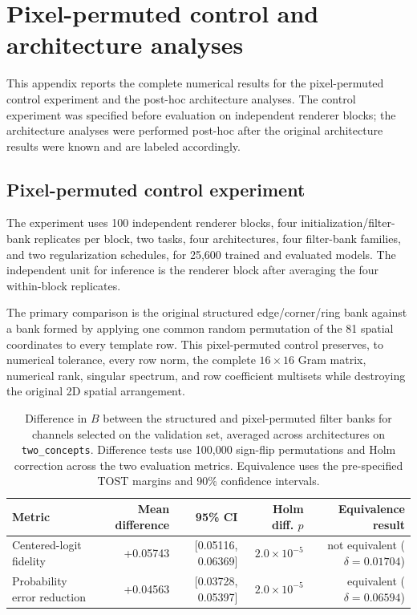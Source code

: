 \section{Pixel-permuted control and architecture analyses}\label{app:specificity}

This appendix reports the complete numerical results for the pixel-permuted control experiment and the post-hoc architecture analyses. The control experiment was specified before evaluation on independent renderer blocks; the architecture analyses were performed post-hoc after the original architecture results were known and are labeled accordingly.

\subsection{Pixel-permuted control experiment}\label{app:anchor-specificity}

The experiment uses 100 independent renderer blocks, four initialization/filter-bank replicates per block, two tasks, four architectures, four filter-bank families, and two regularization schedules, for 25,600 trained and evaluated models. The independent unit for inference is the renderer block after averaging the four within-block replicates.

The primary comparison is the original structured edge/corner/ring bank against a bank formed by applying one common random permutation of the 81 spatial coordinates to every template row. This pixel-permuted control preserves, to numerical tolerance, every row norm, the complete $16\times16$ Gram matrix, numerical rank, singular spectrum, and row coefficient multisets while destroying the original 2D spatial arrangement.

\begin{table}[h]
\caption{Difference in $B$ between the structured and pixel-permuted filter banks for channels selected on the validation set, averaged across architectures on \texttt{two\_concepts}. Difference tests use 100,000 sign-flip permutations and Holm correction across the two evaluation metrics. Equivalence uses the pre-specified TOST margins and 90\% confidence intervals.}
\label{tab:anchor-primary}
\centering
\footnotesize
\setlength{\tabcolsep}{3pt}
\begin{tabular}{lrrrr}
\toprule
Metric & Mean difference & 95\% CI & Holm diff. $p$ & Equivalence result \\
\midrule
Centered-logit fidelity & +0.05743 & [0.05116, 0.06369] & $2.0\times10^{-5}$ & not equivalent ($\delta=0.01704$) \\
Probability error reduction & +0.04563 & [0.03728, 0.05397] & $2.0\times10^{-5}$ & equivalent ($\delta=0.06594$) \\
\bottomrule
\end{tabular}
\end{table}

